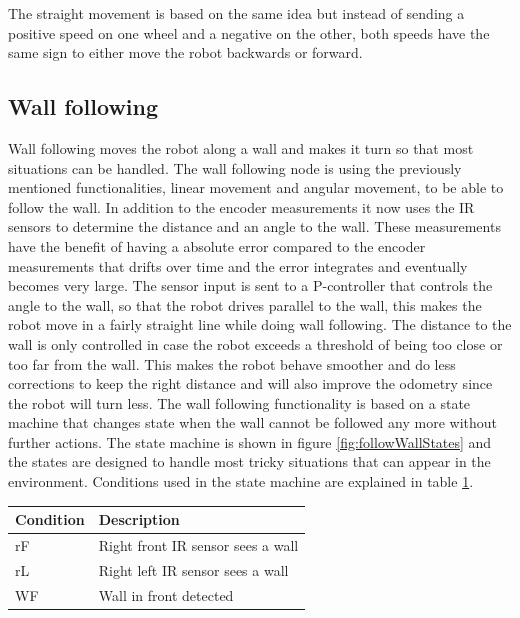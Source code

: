 The straight movement is based on the same idea but instead of sending a positive speed on one wheel and a negative on the other, both speeds have the same sign to either move the robot backwards or forward. 

\subsection{Wall following}
\label{subsec:wallFollowing}

Wall following moves the robot along a wall and makes it turn so that most situations can be handled. The wall following node is using the previously mentioned functionalities, linear movement and angular movement, to be able to follow the wall. In addition to the encoder measurements it now uses the IR sensors to determine the distance and an angle to the wall. These measurements have the benefit of having a absolute error compared to the encoder measurements that drifts over time and the error integrates and eventually becomes very large.
	The sensor input is sent to a P-controller that controls the angle to the wall, so that the robot drives parallel to the wall, this makes the robot move in a fairly straight line while doing wall following. The distance to the wall is only controlled in case the robot exceeds a threshold of being too close or too far from the wall. This makes the robot behave smoother and do less corrections to keep the right distance and will also improve the odometry since the robot will turn less.
	The wall following functionality is based on a state machine that changes state when the wall cannot be followed any more without further actions. The state machine is shown in figure  \ref{fig:followWallStates} and the states are designed to handle most tricky situations that can appear in the environment. Conditions used in the state machine are explained in table \ref{table:conditions}.

\begin{table}
\label{table:conditions}
\center
  \begin{tabular}{l|l}
    \textbf{Condition} & \textbf{Description} \\ \hline
    rF & Right front IR sensor sees a wall \\ \hline
    rL & Right left IR sensor sees a wall \\ \hline
    WF & Wall in front detected \\
    \hline
  \end{tabular}
\end{table}

